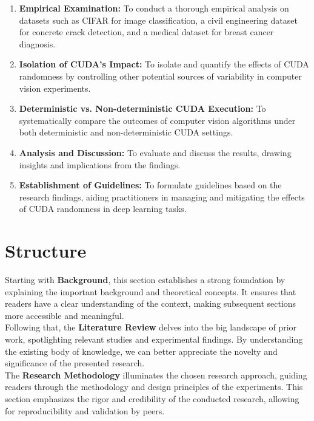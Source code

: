 \begin{enumerate}
  \item \textbf{Empirical Examination:} To conduct a thorough empirical analysis on datasets such as CIFAR for image classification, a civil engineering dataset for concrete crack detection, and a medical dataset for breast cancer diagnosis.
  
  \item \textbf{Isolation of CUDA's Impact:} To isolate and quantify the effects of CUDA randomness by controlling other potential sources of variability in computer vision experiments.
  
  \item \textbf{Deterministic vs. Non-deterministic CUDA Execution:} To systematically compare the outcomes of computer vision algorithms under both deterministic and non-deterministic CUDA settings.
  
  \item \textbf{Analysis and Discussion:} To evaluate and discuss the results, drawing insights and implications from the findings.
  
  \item \textbf{Establishment of Guidelines:} To formulate guidelines based on the research findings, aiding practitioners in managing and mitigating the effects of CUDA randomness in deep learning tasks.
\end{enumerate}

\section{Structure} 

Starting with \textbf{Background}, this section establishes a strong foundation by explaining the important background and theoretical concepts. It ensures that readers have a clear understanding of the context, making subsequent sections more accessible and meaningful.\\

Following that, the \textbf{Literature Review} delves into the big landscape of prior work, spotlighting relevant studies and experimental findings. By understanding the existing body of knowledge, we can better appreciate the novelty and significance of the presented research.\\

The \textbf{Research Methodology} illuminates the chosen research approach, guiding readers through the methodology and design principles of the experiments. This section emphasizes the rigor and credibility of the conducted research, allowing for reproducibility and validation by peers.\\

